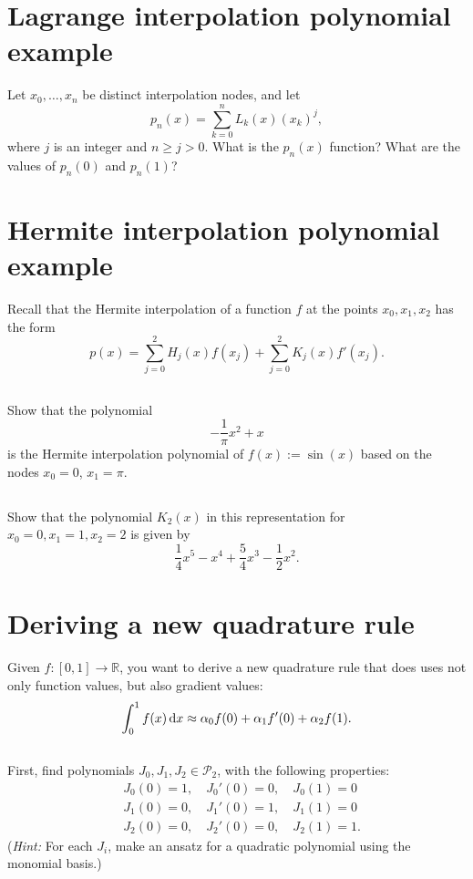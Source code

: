 \documentclass[11pt,letterpaper]{report}
\begin{document}
\section{Lagrange interpolation polynomial example}
Let $x_0,\ldots, x_n$ be distinct interpolation nodes, and let
  $$
  p_n(x) = \sum^n_{k=0}L_{k}(x)(x_k)^j,
  $$
where $j$ is an integer and $n \geq j>0$. What is the $p_n(x)$ function? What are the values of $p_n(0)$ and $p_n(1)$?

\section{Hermite interpolation polynomial example}
Recall that the Hermite interpolation of a function $f$ at the points $x_0,x_1,x_2$ has the form 
$$p(x) = \sum_{j=0}^2H_j(x)f(x_j)
+ \sum_{j=0}^2K_j(x)f'(x_j).$$ 
  
\subsection{}
Show that the polynomial
$$ -\frac{1}{\pi}x^2 + x$$ 
is the Hermite interpolation polynomial of $f(x):=\sin(x)$ based on the nodes $x_0=0$, $x_1=\pi$.
  
\subsection{}
Show that the polynomial $K_2(x)$ in
this representation for $x_0=0,x_1=1,x_2=2$ is given by
$$
\frac{1}{4}x^5 - x^4 + \frac{5}{4}x^3 - \frac{1}{2}x^2.
$$

\section{Deriving a new quadrature rule}
Given $f:[0,1]\rightarrow \mathbb{R}$, you want to derive a new
  quadrature rule that does uses not only function values, but also
  gradient values:
\begin{align}
    \int_0^1 f(x)\,\mathrm{d} x \approx \alpha_0 f(0) + \alpha_1 f'(0) + \alpha_2 f(1). \label{eq:11_3a}
\end{align}
  
\subsection{}
First, find polynomials $J_0, J_1, J_2 \in \mathcal{P}_2$, with the
  following properties:
  \begin{align*}
    & J_0(0)=1,\quad J_0'(0)=0,\quad J_0(1)=0\\
    & J_1(0)=0,\quad J_1'(0)=1,\quad J_1(1)=0\\
    & J_2(0)=0,\quad J_2'(0)=0,\quad J_2(1)=1.
  \end{align*}
  ({\em Hint:} For each $J_i$, make an ansatz for a quadratic polynomial using the monomial basis.)
\end{document}

